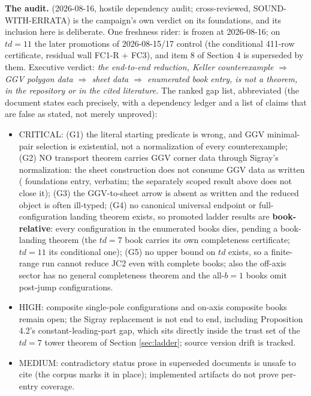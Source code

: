 \documentclass[11pt]{article}
\theoremstyle{definition}
\theoremstyle{remark}
\begin{document}
\textbf{The audit.}  (2026-08-16, hostile dependency
audit; cross-reviewed, 
SOUND-WITH-ERRATA) is the campaign's own verdict on its foundations, and
its inclusion here is deliberate. One freshness rider: 
is frozen at 2026-08-16; on $td=11$ the later  promotions of
2026-08-15/17 control (the conditional 411-row certificate, residual wall
FC1-R + FC3), and item 8 of  Section 4 is superseded by
them. Executive verdict: \emph{the end-to-end
reduction, Keller counterexample $\Rightarrow$ GGV polygon data
$\Rightarrow$ sheet data $\Rightarrow$ enumerated book entry, is not a
theorem, in the repository or in the cited literature.} The ranked gap
list, abbreviated (the document states each precisely, with a dependency
ledger and a list of claims that are false as stated, not merely
unproved):

\begin{itemize}
\item CRITICAL: (G1) the literal starting predicate is wrong, and GGV
minimal-pair selection is existential, not a normalization of every
counterexample; (G2) NO transport theorem carries GGV corner data through
Sigray's normalization: the sheet construction does not consume GGV data
as written ( foundations entry, verbatim; the separately
scoped  result above does not close it); (G3) the
GGV-to-sheet arrow is absent as written and
the reduced object is often ill-typed; (G4) no canonical universal endpoint
or full-configuration landing theorem exists, so promoted ladder results
are \textbf{book-relative}: every configuration in the enumerated books
dies, pending a book-landing theorem (the $td=7$ book carries its own
completeness certificate; $td=11$ its conditional one); (G5) no upper bound
on $td$ exists, so a finite-range run cannot reduce JC2 even with complete
books; also the off-axis sector has no general completeness theorem and
the all-$b=1$ books omit post-jump configurations.
\item HIGH: composite single-pole configurations and on-axis composite
books remain open; the Sigray replacement is not end to end, including
Proposition 4.2's constant-leading-part gap, which sits directly inside
the trust set of the $td=7$ tower theorem of Section \ref{sec:ladder};
source version drift is tracked.
\item MEDIUM: contradictory status prose in superseded documents is unsafe
to cite (the corpus marks it in place); implemented artifacts do not prove
per-entry coverage.
\end{itemize}
\end{document}
